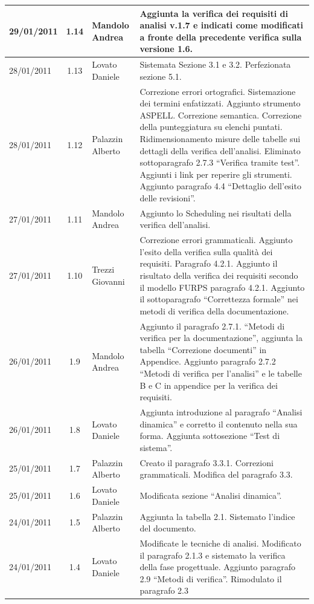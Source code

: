 \begin{longtable}{|p{}|c|p{}|p{}|}
\hline
29/01/2011 & 1.14 & Mandolo Andrea & Aggiunta la verifica dei requisiti di
analisi v.1.7 e indicati come modificati a fronte della precedente verifica
sulla versione 1.6.\\
\hline
28/01/2011 & 1.13 & Lovato Daniele & Sistemata Sezione 3.1 e 3.2.
Perfezionata sezione 5.1.\\
\hline
28/01/2011 & 1.12 & Palazzin Alberto & Correzione errori ortografici.
Sistemazione dei termini enfatizzati. Aggiunto strumento ASPELL. Correzione
semantica. Correzione della punteggiatura su elenchi puntati.
Ridimensionamento misure delle tabelle sui dettagli della verifica
dell'analisi. Eliminato sottoparagrafo 2.7.3 ``Verifica tramite test''.
Aggiunti i link per reperire gli strumenti. Aggiunto paragrafo 4.4 ``Dettaglio
dell'esito delle revisioni''.\\
\hline
27/01/2011 & 1.11 & Mandolo Andrea & Aggiunto lo Scheduling nei risultati
della verifica dell'analisi.\\
\hline
27/01/2011 & 1.10 & Trezzi Giovanni & Correzione errori grammaticali. Aggiunto
l'esito della verifica sulla qualit\`a dei requisiti. Paragrafo 4.2.1. Aggiunto
il risultato della verifica dei requisiti secondo il modello FURPS paragrafo
4.2.1. Aggiunto il sottoparagrafo ``Correttezza formale'' nei metodi di
verifica della documentazione.\\
\hline
26/01/2011 & 1.9 & Mandolo Andrea & Aggiunto
il paragrafo 2.7.1. ``Metodi di verifica per la documentazione'', aggiunta la
tabella ``Correzione documenti'' in Appendice. Aggiunto paragrafo 2.7.2 ``Metodi
di verifica per l'analisi'' e le tabelle B e C in appendice per la verifica dei requisiti.\\
\hline
26/01/2011 & 1.8 & Lovato Daniele & Aggiunta introduzione al paragrafo
``Analisi dinamica'' e corretto il contenuto nella sua forma. Aggiunta
sottosezione ``Test di sistema''.\\
\hline
25/01/2011 & 1.7 & Palazzin Alberto & Creato il paragrafo 3.3.1. Correzioni
grammaticali. Modifica del paragrafo 3.3.\\
\hline
25/01/2011 & 1.6 & Lovato Daniele & Modificata sezione ``Analisi dinamica''.\\
\hline
24/01/2011 & 1.5 & Palazzin Alberto & Aggiunta la tabella 2.1. Sistemato
l'indice del documento.\\
\hline
24/01/2011 & 1.4 & Lovato Daniele & Modificate le tecniche di analisi.
Modificato il paragrafo 2.1.3 e sistemato la verifica della fase progettuale.
Aggiunto paragrafo 2.9 ``Metodi di verifica''. Rimodulato il paragrafo 2.3

\end{longtable}
